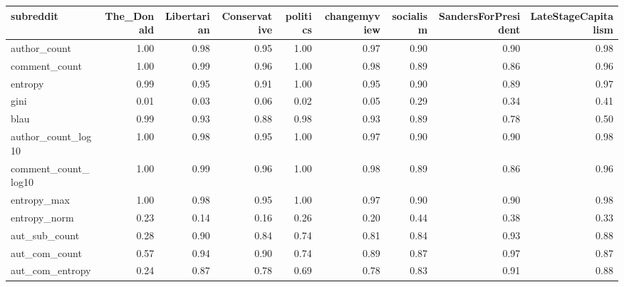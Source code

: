 \begin{table}
\centering
\begin{tabular}{lrrrrrrrr}
\toprule
subreddit &  The\_Donald &  Libertarian &  Conservative &  politics &  changemyview &  socialism &  SandersForPresident &  LateStageCapitalism \\
\midrule
author\_count        &        1.00 &         0.98 &          0.95 &      1.00 &          0.97 &       0.90 &                 0.90 &                 0.98 \\
comment\_count       &        1.00 &         0.99 &          0.96 &      1.00 &          0.98 &       0.89 &                 0.86 &                 0.96 \\
entropy             &        0.99 &         0.95 &          0.91 &      1.00 &          0.95 &       0.90 &                 0.89 &                 0.97 \\
gini                &        0.01 &         0.03 &          0.06 &      0.02 &          0.05 &       0.29 &                 0.34 &                 0.41 \\
blau                &        0.99 &         0.93 &          0.88 &      0.98 &          0.93 &       0.89 &                 0.78 &                 0.50 \\
author\_count\_log10  &        1.00 &         0.98 &          0.95 &      1.00 &          0.97 &       0.90 &                 0.90 &                 0.98 \\
comment\_count\_log10 &        1.00 &         0.99 &          0.96 &      1.00 &          0.98 &       0.89 &                 0.86 &                 0.96 \\
entropy\_max         &        1.00 &         0.98 &          0.95 &      1.00 &          0.97 &       0.90 &                 0.90 &                 0.98 \\
entropy\_norm        &        0.23 &         0.14 &          0.16 &      0.26 &          0.20 &       0.44 &                 0.38 &                 0.33 \\
aut\_sub\_count       &        0.28 &         0.90 &          0.84 &      0.74 &          0.81 &       0.84 &                 0.93 &                 0.88 \\
aut\_com\_count       &        0.57 &         0.94 &          0.90 &      0.74 &          0.89 &       0.87 &                 0.97 &                 0.87 \\
aut\_com\_entropy     &        0.24 &         0.87 &          0.78 &      0.69 &          0.78 &       0.83 &                 0.91 &                 0.88 \\

\end{tabular}
\end{table}

